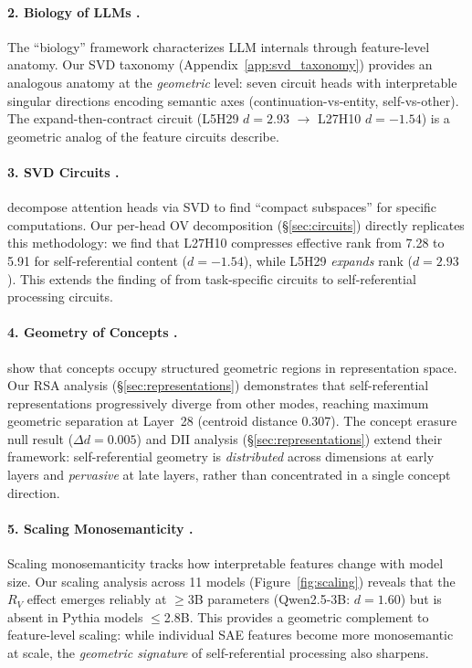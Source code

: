 \documentclass{article}
\newcommand{\RV}{R_V}
\newcommand{\dcohen}{d}
\begin{document}
\paragraph{2. Biology of LLMs \citep{lindsey2025biology}.}
The ``biology'' framework characterizes LLM internals through feature-level anatomy.
Our SVD taxonomy (Appendix~\ref{app:svd_taxonomy}) provides an analogous anatomy at the \emph{geometric} level: seven circuit heads with interpretable singular directions encoding semantic axes (continuation-vs-entity, self-vs-other).
The expand-then-contract circuit (L5H29 $\dcohen{=}2.93$ $\to$ L27H10 $\dcohen{=}{-}1.54$) is a geometric analog of the feature circuits \citet{lindsey2025biology} describe.

\paragraph{3. SVD Circuits \citep{gupta2025beyond}.}
\citet{gupta2025beyond} decompose attention heads via SVD to find ``compact subspaces'' for specific computations.
Our per-head OV decomposition (\S\ref{sec:circuits}) directly replicates this methodology: we find that L27H10 compresses effective rank from 7.28 to 5.91 for self-referential content ($\dcohen{=}{-}1.54$), while L5H29 \emph{expands} rank ($\dcohen{=}2.93$).
This extends the finding of \citet{gupta2025beyond} from task-specific circuits to self-referential processing circuits.

\paragraph{4. Geometry of Concepts \citep{park2024geometry}.}
\citet{park2024geometry} show that concepts occupy structured geometric regions in representation space.
Our RSA analysis (\S\ref{sec:representations}) demonstrates that self-referential representations progressively diverge from other modes, reaching maximum geometric separation at Layer~28 (centroid distance 0.307).
The concept erasure null result ($\Delta d{=}0.005$) and DII analysis (\S\ref{sec:representations}) extend their framework: self-referential geometry is \emph{distributed} across dimensions at early layers and \emph{pervasive} at late layers, rather than concentrated in a single concept direction.

\paragraph{5. Scaling Monosemanticity \citep{templeton2024scaling}.}
Scaling monosemanticity tracks how interpretable features change with model size.
Our scaling analysis across 11 models (Figure~\ref{fig:scaling}) reveals that the $\RV$ effect emerges reliably at $\geq$3B parameters (Qwen2.5-3B: $\dcohen{=}1.60$) but is absent in Pythia models $\leq$2.8B.
This provides a geometric complement to feature-level scaling: while individual SAE features become more monosemantic at scale, the \emph{geometric signature} of self-referential processing also sharpens.
\end{document}
